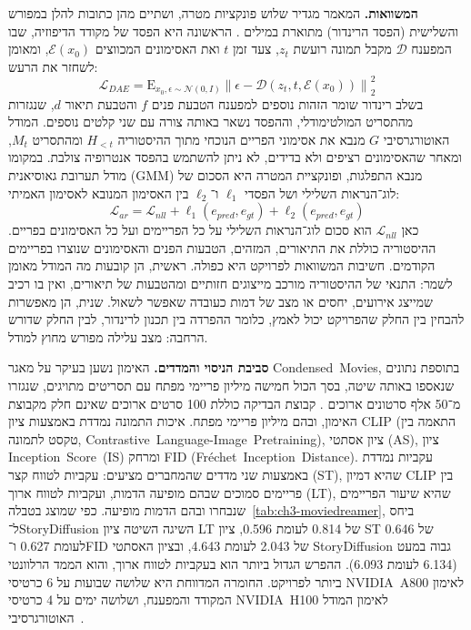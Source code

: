 \textbf{המשוואות.} המאמר מגדיר שלוש פונקציות מטרה, ושתיים מהן כתובות להלן במפורש והשלישית (הפסד הרינדור) מתוארת במילים \cite{zhao2025moviedreamer}. הראשונה היא הפסד של מקודד הדיפוזיה, שבו המפענח $\mathcal{D}$ מקבל תמונה רועשת $z_t$, צעד זמן $t$ ואת האסימונים המכווצים $\mathcal{E}(x_0)$, ומאומן לשחזר את הרעש:
\begin{equation}
  \mathcal{L}_{DAE} = \mathrm{E}_{x_0,\epsilon\sim\mathcal{N}(0,I)} \left\| \epsilon - \mathcal{D}(z_t, t, \mathcal{E}(x_0)) \right\|_2^2
\end{equation}
בשלב רינדור שומר הזהות נוספים למפענח הטבעת פנים $f$ והטבעת תיאור $d$, שנגזרות מהתסריט המולטימודלי, וההפסד נשאר באותה צורה עם שני קלטים נוספים. המודל האוטורגרסיבי $G$ מנבא את אסימוני הפריים הנוכחי מתוך ההיסטוריה $H_{<t}$ ומהתסריט $M_t$, ומאחר שהאסימונים רציפים ולא בדידים, לא ניתן להשתמש בהפסד אנטרופיה צולבת. במקומו מודל תערובת גאוסיאנית (\textenglish{GMM}) מנבא התפלגות, ופונקציית המטרה היא הסכום של לוג־הנראות השלילי ושל הפסדי $\ell_1$ ו־$\ell_2$ בין האסימון המנובא לאסימון האמיתי:
\begin{equation}
  \mathcal{L}_{ar} = \mathcal{L}_{nll} + \ell_1(e_{pred}, e_{gt}) + \ell_2(e_{pred}, e_{gt})
\end{equation}
כאן $\mathcal{L}_{nll}$ הוא סכום לוג־הנראות השלילי על כל הפריימים ועל כל האסימונים בפריים. ההיסטוריה כוללת את התיאורים, המזהים, הטבעות הפנים והאסימונים שנוצרו בפריימים הקודמים. חשיבות המשוואות לפרויקט היא כפולה. ראשית, הן קובעות מה המודל מאומן לשמר: התנאי של ההיסטוריה מורכב מייצוגים חזותיים ומהטבעות של תיאורים, ואין בו רכיב שמייצג אירועים, יחסים או מצב של דמות כעובדה שאפשר לשאול. שנית, הן מאפשרות להבחין בין החלק שהפרויקט יכול לאמץ, כלומר ההפרדה בין תכנון לרינדור, לבין החלק שדורש הרחבה: מצב עלילה מפורש מחוץ למודל.

\textbf{סביבת הניסוי והמדדים.} האימון נשען בעיקר על מאגר \mbox{\textenglish{Condensed Movies}}, בתוספת נתונים שנאספו באותה שיטה, בסך הכול חמישה מיליון פריימי מפתח עם תסריטים מתויגים, שנגזרו מ־50 אלף סרטונים ארוכים \cite{zhao2025moviedreamer}. קבוצת הבדיקה כוללת 100 סרטים ארוכים שאינם חלק מקבוצת האימון, ובהם מיליון פריימי מפתח. איכות התמונה נמדדת באמצעות ציון \textenglish{CLIP} (התאמה בין טקסט לתמונה, \mbox{\textenglish{Contrastive Language-Image Pretraining}}), ציון אסתטי (\textenglish{AS}), ציון \mbox{\textenglish{Inception Score (IS)}} ומרחק \textenglish{FID} (\mbox{\textenglish{Fréchet Inception Distance}}). עקביות נמדדת באמצעות שני מדדים שהמחברים מציעים: עקביות לטווח קצר (\textenglish{ST}), שהיא דמיון \textenglish{CLIP} בין פריימים סמוכים שבהם מופיעה הדמות, ועקביות לטווח ארוך (\textenglish{LT}), שהיא שיעור הפריימים שנבחרו ובהם הדמות מופיעה. כפי שמוצג בטבלה~\ref{tab:ch3-moviedreamer}, ביחס ל־\textenglish{StoryDiffusion} השיגה השיטה ציון \textenglish{LT} של 0.814 לעומת 0.596, ציון \textenglish{ST} של 0.646 לעומת 0.627 ו־\textenglish{FID} של 2.043 לעומת 4.643, ובציון האסתטי \textenglish{StoryDiffusion} גבוה במעט (6.134 לעומת 6.093). ההפרש הגדול ביותר הוא בעקביות לטווח ארוך, והוא הממד הרלוונטי ביותר לפרויקט. החומרה המדווחת היא שלושה שבועות על 6 כרטיסי \mbox{\textenglish{NVIDIA A800}} לאימון המקודד והמפענח, ושלושה ימים על 4 כרטיסי \mbox{\textenglish{NVIDIA H100}} לאימון המודל האוטורגרסיבי~\cite{zhao2025moviedreamer}.


